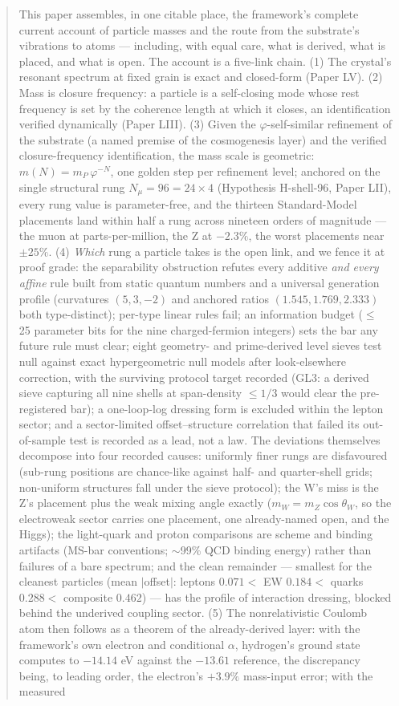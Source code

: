 \documentclass[12pt]{article}
\theoremstyle{definition}
\theoremstyle{remark}
\begin{document}
\begin{abstract}
This paper assembles, in one citable place, the framework's complete current account of particle masses and the route from the substrate's vibrations to atoms --- including, with equal care, what is derived, what is placed, and what is open. The account is a five-link chain. (1) The crystal's resonant spectrum at fixed grain is exact and closed-form (Paper LV). (2) Mass is closure frequency: a particle is a self-closing mode whose rest frequency is set by the coherence length at which it closes, an identification verified dynamically (Paper LIII). (3) Given the $\varphi$-self-similar refinement of the substrate (a named premise of the cosmogenesis layer) and the verified closure-frequency identification, the mass scale is geometric: $m(N) = m_P\,\varphi^{-N}$, one golden step per refinement level; anchored on the single structural rung $N_\mu = 96 = 24\times4$ (Hypothesis H-shell-96, Paper LII), every rung value is parameter-free, and the thirteen Standard-Model placements land within half a rung across nineteen orders of magnitude --- the muon at parts-per-million, the Z at $-2.3\%$, the worst placements near $\pm25\%$. (4) \emph{Which} rung a particle takes is the open link, and we fence it at proof grade: the separability obstruction refutes every additive \emph{and every affine} rule built from static quantum numbers and a universal generation profile (curvatures $(5,3,-2)$ and anchored ratios $(1.545, 1.769, 2.333)$ both type-distinct); per-type linear rules fail; an information budget ($\le$ 25 parameter bits for the nine charged-fermion integers) sets the bar any future rule must clear; eight geometry- and prime-derived level sieves test null against exact hypergeometric null models after look-elsewhere correction, with the surviving protocol target recorded (GL3: a derived sieve capturing all nine shells at span-density $\le 1/3$ would clear the pre-registered bar); a one-loop-log dressing form is excluded within the lepton sector; and a sector-limited offset--structure correlation that failed its out-of-sample test is recorded as a lead, not a law. The deviations themselves decompose into four recorded causes: uniformly finer rungs are disfavoured (sub-rung positions are chance-like against half- and quarter-shell grids; non-uniform structures fall under the sieve protocol); the W's miss is the Z's placement plus the weak mixing angle exactly ($m_W = m_Z\cos\theta_W$, so the electroweak sector carries one placement, one already-named open, and the Higgs); the light-quark and proton comparisons are scheme and binding artifacts (MS-bar conventions; $\sim$99\% QCD binding energy) rather than failures of a bare spectrum; and the clean remainder --- smallest for the cleanest particles (mean $|$offset$|$: leptons $0.071 <$ EW $0.184 <$ quarks $0.288 <$ composite $0.462$) --- has the profile of interaction dressing, blocked behind the underived coupling sector. (5) The nonrelativistic Coulomb atom then follows as a theorem of the already-derived layer: with the framework's own electron and conditional $\alpha$, hydrogen's ground state computes to $-14.14$ eV against the $-13.61$ reference, the discrepancy being, to leading order, the electron's $+3.9\%$ mass-input error; with the measured 
\end{abstract}
\end{document}
